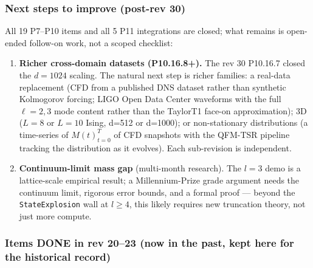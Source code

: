 \documentclass[11pt, a4paper]{article}
\begin{document}
\subsubsection*{Next steps to improve (post-rev 30)}

All 19 P7--P10 items and all 5 P11 integrations are closed; what remains
is open-ended follow-on work, not a scoped checklist:

\begin{enumerate}
\item \textbf{Richer cross-domain datasets (P10.16.8+).} The rev 30
  P10.16.7 closed the $d=1024$ scaling. The natural next step is
  richer families: a real-data replacement (CFD from a published DNS
  dataset rather than synthetic Kolmogorov forcing; LIGO Open Data
  Center waveforms with the full $\ell=2,3$ mode content rather
  than the TaylorT1 face-on approximation); 3D ($L=8$ or $L=10$
  Ising, d=512 or d=1000); or non-stationary distributions (a
  time-series of ${M(t)}_{t=0}^{T}$ of CFD snapshots with the
  QFM-TSR pipeline tracking the distribution as it evolves).
  Each sub-revision is independent.

\item \textbf{Continuum-limit mass gap} (multi-month research). The
  $l=3$ demo is a lattice-scale empirical result; a Millennium-Prize
  grade argument needs the continuum limit, rigorous error bounds, and
  a formal proof --- beyond the \texttt{StateExplosion} wall at
  $l\ge 4$, this likely requires new truncation theory, not just more
  compute.
\end{enumerate}

\subsubsection*{Items DONE in rev 20--23 (now in the past, kept here for the historical record)}
\end{document}
